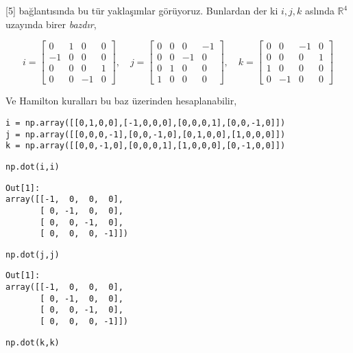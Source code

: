 \documentclass[12pt,fleqn]{article}\usepackage{../../common}
\begin{document}
[5] bağlantısında bu tür yaklaşımlar görüyoruz. Bunlardan der ki $i,j,k$ aslında
$\mathbb{R}^4$ uzayında birer {\em bazdır},

$$
i = \left[\begin{array}{cccc}
0 & 1 & 0 & 0 \\ -1 & 0 & 0 & 0 \\ 0 & 0 & 0 & 1\\ 0 & 0 & -1 & 0 
\end{array}\right], \quad 
j = \left[\begin{array}{cccc}
0 & 0 & 0 & -1 \\ 0 & 0 & -1 & 0 \\ 0 & 1 & 0 & 0\\ 1 & 0 & 0 & 0 
\end{array}\right], \quad
k = \left[\begin{array}{cccc}
0 & 0 & -1 & 0 \\ 0 & 0 & 0 & 1 \\ 1 & 0 & 0 & 0\\ 0 & -1 & 0 & 0 
\end{array}\right]
$$

Ve Hamilton kuralları bu baz üzerinden hesaplanabilir,

\begin{verbatim}
i = np.array([[0,1,0,0],[-1,0,0,0],[0,0,0,1],[0,0,-1,0]])
j = np.array([[0,0,0,-1],[0,0,-1,0],[0,1,0,0],[1,0,0,0]])
k = np.array([[0,0,-1,0],[0,0,0,1],[1,0,0,0],[0,-1,0,0]])
\end{verbatim}

\begin{verbatim}
np.dot(i,i)
\end{verbatim}

\begin{verbatim}
Out[1]: 
array([[-1,  0,  0,  0],
       [ 0, -1,  0,  0],
       [ 0,  0, -1,  0],
       [ 0,  0,  0, -1]])
\end{verbatim}

\begin{verbatim}
np.dot(j,j)
\end{verbatim}

\begin{verbatim}
Out[1]: 
array([[-1,  0,  0,  0],
       [ 0, -1,  0,  0],
       [ 0,  0, -1,  0],
       [ 0,  0,  0, -1]])
\end{verbatim}

\begin{verbatim}
np.dot(k,k)
\end{verbatim}
\end{document}
